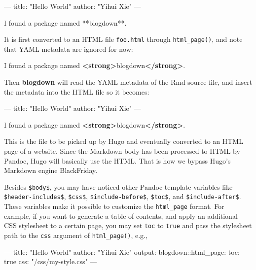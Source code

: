 \documentclass[12pt,]{krantz}
\makeatletter
\newenvironment{Shaded}{\begin{snugshade}}{\end{snugshade}}
\newcommand{\AttributeTok}[1]{\textcolor[rgb]{0.77,0.63,0.00}{#1}}
\newcommand{\FunctionTok}[1]{\textcolor[rgb]{0.00,0.00,0.00}{#1}}
\newcommand{\KeywordTok}[1]{\textcolor[rgb]{0.13,0.29,0.53}{\textbf{#1}}}
\newcommand{\NormalTok}[1]{#1}
\newcommand{\OtherTok}[1]{\textcolor[rgb]{0.56,0.35,0.01}{#1}}
\newcommand{\StringTok}[1]{\textcolor[rgb]{0.31,0.60,0.02}{#1}}
\newenvironment{kframe}{%
\medskip{}
\setlength{\fboxsep}{.8em}
 \def\at@end@of@kframe{}%
 \ifinner\ifhmode%
  \def\at@end@of@kframe{\end{minipage}}%
  \begin{minipage}{\columnwidth}%
 \fi\fi%
 \def\FrameCommand##1{\hskip\@totalleftmargin \hskip-\fboxsep
 \colorbox{shadecolor}{##1}\hskip-\fboxsep
     \hskip-\linewidth \hskip-\@totalleftmargin \hskip\columnwidth}%
 \MakeFramed {\advance\hsize-\width
   \@totalleftmargin\z@ \linewidth\hsize
   \@setminipage}}%
 {\par\unskip\endMakeFramed%
 \at@end@of@kframe}
\renewenvironment{Shaded}{\begin{kframe}}{\end{kframe}}
\theoremstyle{definition}
\theoremstyle{definition}
\theoremstyle{definition}
\theoremstyle{remark}
\makeatother
\begin{document}
\begin{Shaded}
\begin{Highlighting}[]
\NormalTok{---}
\NormalTok{title: "Hello World"}
\NormalTok{author: "Yihui Xie"}
\NormalTok{---}

\NormalTok{I found a package named **blogdown**.}
\end{Highlighting}
\end{Shaded}

It is first converted to an HTML file \texttt{foo.html} through
\texttt{html\_page()}, and note that YAML metadata are ignored for now:

\begin{Shaded}
\begin{Highlighting}[]
\NormalTok{I found a package named }\KeywordTok{<strong>}\NormalTok{blogdown}\KeywordTok{</strong>}\NormalTok{.}
\end{Highlighting}
\end{Shaded}

Then \textbf{blogdown} will read the YAML metadata of the Rmd source
file, and insert the metadata into the HTML file so it becomes:

\begin{Shaded}
\begin{Highlighting}[]
\NormalTok{---}
\NormalTok{title: "Hello World"}
\NormalTok{author: "Yihui Xie"}
\NormalTok{---}

\NormalTok{I found a package named }\KeywordTok{<strong>}\NormalTok{blogdown}\KeywordTok{</strong>}\NormalTok{.}
\end{Highlighting}
\end{Shaded}

This is the file to be picked up by Hugo and eventually converted to an
HTML page of a website. Since the Markdown body has been processed to
HTML by Pandoc, Hugo will basically use the HTML. That is how we bypass
Hugo's Markdown engine BlackFriday.

Besides \texttt{\$body\$}, you may have noticed other Pandoc template
variables like \texttt{\$header-includes\$}, \texttt{\$css\$},
\texttt{\$include-before\$}, \texttt{\$toc\$}, and
\texttt{\$include-after\$}. These variables make it possible to
customize the \texttt{html\_page} format. For example, if you want to
generate a table of contents, and apply an additional CSS stylesheet to
a certain page, you may set \texttt{toc} to \texttt{true} and pass the
stylesheet path to the \texttt{css} argument of \texttt{html\_page()},
e.g.,

\begin{Shaded}
\begin{Highlighting}[]
\OtherTok{---}
\FunctionTok{title:}\AttributeTok{ }\StringTok{"Hello World"}
\FunctionTok{author:}\AttributeTok{ }\StringTok{"Yihui Xie"}
\FunctionTok{output:}
  \FunctionTok{blogdown:}\AttributeTok{:html_page:}
    \FunctionTok{toc:}\AttributeTok{ true}
    \FunctionTok{css:}\AttributeTok{ }\StringTok{"/css/my-style.css"}
\OtherTok{---}
\end{Highlighting}
\end{Shaded}
\end{document}
